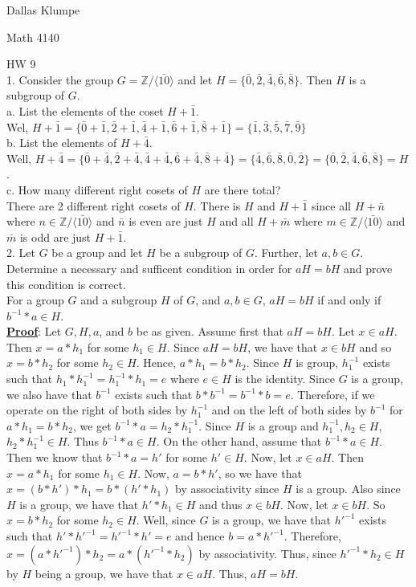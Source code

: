 \documentclass[12pt]{article}
\begin{document}
\noindent Dallas Klumpe

\noindent Math 4140

\noindent HW 9\\

1. Consider the group $G=\mathbb{Z}/\langle\bar{10}\rangle$ and let $H=\{\bar{0},\bar{2},\bar{4},\bar{6},\bar{8}\}$. Then $H$ is a subgroup of $G$.\\
a. List the elements of the coset $H+\bar{1}$.\\
Wel, $H+\bar{1}=\{\bar{0}+\bar{1},\bar{2}+\bar{1},\bar{4}+\bar{1},\bar{6}+\bar{1},\bar{8}+\bar{1}\}=\{\bar{1},\bar{3},\bar{5},\bar{7},\bar{9}\}$\\
b. List the elements of $H+\bar{4}$.\\
Well, $H+\bar{4}=\{\bar{0}+\bar{4},\bar{2}+\bar{4},\bar{4}+\bar{4},\bar{6}+\bar{4},\bar{8}+\bar{4}\}=\{\bar{4},\bar{6},\bar{8},\bar{0},\bar{2}\}=\{\bar{0},\bar{2},\bar{4},\bar{6},\bar{8}\}=H$.\\
c. How many different right cosets of $H$ are there total?\\
There are 2 different right cosets of $H$. There is $H$ and $H+\bar{1}$ since all $H+\bar{n}$ where $n\in\mathbb{Z}/\langle\bar{10}\rangle$ and $\bar{n}$ is even are just $H$ and all $H+\bar{m}$ where $m\in\mathbb{Z}/\langle\bar{10}\rangle$ and $\bar{m}$ is odd are just $H+\bar{1}$.\\[20pt]

2. Let $G$ be a group and let $H$ be a subgroup of $G$. Further, let $a,b\in G$. Determine a necessary and sufficent condition in order for $aH=bH$ and prove this condition is correct.\\
For a group $G$ and a subgroup $H$ of $G$, and $a,b\in G$, $aH=bH$ if and only if $b^{-1}*a\in H$.\\
\underline{\textbf{Proof}}: Let $G, H, a$, and $b$ be as given. Assume first that $aH=bH$. Let $x\in aH$. Then $x=a*h_1$ for some $h_1\in H$. Since $aH=bH$, we have that $x\in bH$ and so $x=b*h_2$ for some $h_2\in H$. Hence, $a*h_1=b*h_2$. Since $H$ is group, $h_1^{-1}$ exists such that $h_1*h_1^{-1}=h_1^{-1}*h_1=e$ where $e\in H$ is the identity. Since $G$ is a group, we also have that $b^{-1}$ exists such that $b*b^{-1}=b^{-1}*b=e$. Therefore, if we operate on the right of both sides by $h_1^{-1}$ and on the left of both sides by $b^{-1}$ for $a*h_1=b*h_2$, we get $b^{-1}*a=h_2*h_1^{-1}$. Since $H$ is a group and $h_1^{-1}, h_2\in H$, $h_2*h_1^{-1}\in H$. Thus $b^{-1}*a\in H$. On the other hand, assume that $b^{-1}*a\in H$. Then we know that $b^{-1}*a=h'$ for some $h'\in H$. Now, let $x\in aH$. Then $x=a*h_1$ for some $h_1\in H$. Now, $a=b*h'$, so we have that $x=(b*h')*h_1=b*(h'*h_1)$ by associativity since $H$ is a group. Also since $H$ is a group, we have that $h'*h_1\in H$ and thus $x\in bH$. Now, let $x\in bH$. So $x=b*h_2$ for some $h_2\in H$. Well, since $G$ is a group, we have that $h'^{-1}$ exists such that $h'*h'^{-1}=h'^{-1}*h'=e$ and hence $b=a*h'^{-1}$. Therefore, $x=(a*h'^{-1})*h_2=a*(h'^{-1}*h_2)$ by associativity. Thus, since $h'^{-1}*h_2\in H$ by $H$ being a group, we have that $x\in aH$. Thus, $aH=bH$.\\[20pt]
\end{document}
